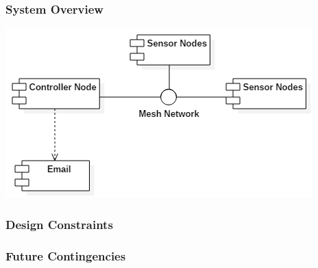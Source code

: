 \documentclass[11pt,a4paper]{article}
\begin{document}
\subsubsection{System Overview}
\begin{center}
	\includegraphics[scale=0.75, keepaspectratio=true]{Graphics/SimpleOverview.png}
\end{center}

\subsubsection{Design Constraints}

\subsubsection{Future Contingencies}
\end{document}
